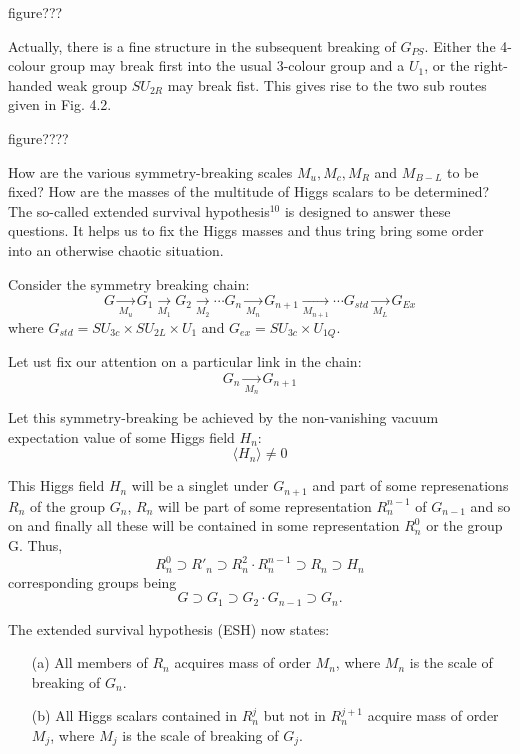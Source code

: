 figure???

Actually, there is a fine structure in the subsequent breaking of $G_{PS}$. Either the 4-colour group may break first into the usual 3-colour group and a $U_{1}$, or the right-handed weak group $SU_{2R}$ may break fist. This gives rise to the two sub routes given in Fig. 4.2.

figure????

How are the various symmetry-breaking scales $M_{u}, M_{c}, M_{R}$ and $M_{B-L}$ to be fixed? How are the masses of the multitude of Higgs scalars to be determined? The so-called extended survival hypothesis$^{10}$ is designed to answer these questions. It helps us to fix the Higgs masses and thus tring bring some order into an otherwise chaotic situation.

Consider the symmetry breaking chain:
$$
G \xrightarrow[M_{u}]{} G_{1} \xrightarrow[M_{1}]{} G_{2} \xrightarrow[M_{2}]{} \cdots G_{n} \xrightarrow[M_{n}]{} G_{n+1} \xrightarrow[M_{n+1}]{} \cdots G_{std} \xrightarrow[M_{L}]{} G_{Ex}
$$
where $G_{std}= SU_{3c} \times SU_{2L} \times U_{1}$ and $G_{ex}= SU_{3c} \times U_{1 Q}$.

Let ust fix our attention on a particular link in the chain:
$$
G_{n} \xrightarrow[M_{n}]{} G_{n+1}
$$

\newpage
Let this symmetry-breaking be achieved by the non-vanishing vacuum expectation value of some Higgs field $H_{n}$:
$$
\langle H_{n} \rangle \neq 0
$$

This Higgs field $H_{n}$ will be a singlet under $G_{n+1}$ and part of some represenations $R_{n}$ of the group $G_{n}$, $R_{n}$ will be part of some representation $R^{n-1}_{n}$ of $G_{n-1}$ and so on and finally all these will be contained in some representation $R^{0}_{n}$ or the group G. Thus,
$$
R^{0}_{n} \supset R'_{n} \supset R^{2}_{n} \cdot R^{n-1}_{n} \supset R_{n} \supset H_{n}
$$
corresponding groups being
$$
G \supset G_{1} \supset G_{2} \cdot G_{n-1} \supset G_{n}.
$$

The extended survival hypothesis (ESH) now states:

\begin{itemize}
\item[(a)] All members of $R_{n}$ acquires mass of order $M_{n}$, where $M_{n}$ is the scale of breaking of $G_{n}$.
\item[(b)] All Higgs scalars contained in $R^{j}_{n}$ but not in $R_{n}^{j+1}$ acquire mass of order $M_{j}$, where $M_{j}$ is the scale of breaking of $G_{j}$.
\end{itemize}

